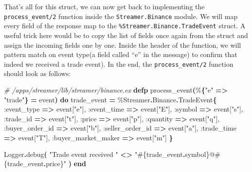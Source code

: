 \documentclass[
  oneside]{book}
\newenvironment{Shaded}{\begin{snugshade}}{\end{snugshade}}
\newcommand{\CommentTok}[1]{\textcolor[rgb]{0.56,0.35,0.01}{\textit{#1}}}
\newcommand{\ConstantTok}[1]{\textcolor[rgb]{0.56,0.35,0.01}{#1}}
\newcommand{\FunctionTok}[1]{\textcolor[rgb]{0.13,0.29,0.53}{\textbf{#1}}}
\newcommand{\KeywordTok}[1]{\textcolor[rgb]{0.13,0.29,0.53}{\textbf{#1}}}
\newcommand{\NormalTok}[1]{#1}
\newcommand{\OperatorTok}[1]{\textcolor[rgb]{0.81,0.36,0.00}{\textbf{#1}}}
\newcommand{\OtherTok}[1]{\textcolor[rgb]{0.56,0.35,0.01}{#1}}
\newcommand{\StringTok}[1]{\textcolor[rgb]{0.31,0.60,0.02}{#1}}
\newcommand{\VariableTok}[1]{\textcolor[rgb]{0.00,0.00,0.00}{#1}}
\begin{document}
That's all for this struct, we can now get back to implementing the \texttt{process\_event/2} function inside the \texttt{Streamer.Binance} module. We will map every field of the response map to the \texttt{\%Streamer.Binance.TradeEvent} struct. A useful trick here would be to copy the list of fields once again from the struct and assign the incoming fields one by one.
Inside the header of the function, we will pattern match on event type(a field called ``e'' in the message) to confirm that indeed we received a trade event). In the end, the \texttt{process\_event/2} function should look as follows:

\begin{Shaded}
\begin{Highlighting}[]
  \CommentTok{\# /apps/streamer/lib/streamer/binance.ex}
  \KeywordTok{defp}\NormalTok{ process\_event}\FunctionTok{(}\NormalTok{\%}\FunctionTok{\{}\StringTok{"e"} \OperatorTok{=\textgreater{}} \StringTok{"trade"}\FunctionTok{\}} \OperatorTok{=}\NormalTok{ event}\FunctionTok{)} \KeywordTok{do}
\NormalTok{    trade\_event }\OperatorTok{=}\NormalTok{ \%}\ConstantTok{Streamer}\OperatorTok{.}\ConstantTok{Binance}\OperatorTok{.}\ConstantTok{TradeEvent}\FunctionTok{\{}
      \VariableTok{:event\_type} \OperatorTok{=\textgreater{}}\NormalTok{ event}\OtherTok{[}\StringTok{"e"}\OtherTok{]}\NormalTok{,}
      \VariableTok{:event\_time} \OperatorTok{=\textgreater{}}\NormalTok{ event}\OtherTok{[}\StringTok{"E"}\OtherTok{]}\NormalTok{,}
      \VariableTok{:symbol} \OperatorTok{=\textgreater{}}\NormalTok{ event}\OtherTok{[}\StringTok{"s"}\OtherTok{]}\NormalTok{,}
      \VariableTok{:trade\_id} \OperatorTok{=\textgreater{}}\NormalTok{ event}\OtherTok{[}\StringTok{"t"}\OtherTok{]}\NormalTok{,}
      \VariableTok{:price} \OperatorTok{=\textgreater{}}\NormalTok{ event}\OtherTok{[}\StringTok{"p"}\OtherTok{]}\NormalTok{,}
      \VariableTok{:quantity} \OperatorTok{=\textgreater{}}\NormalTok{ event}\OtherTok{[}\StringTok{"q"}\OtherTok{]}\NormalTok{,}
      \VariableTok{:buyer\_order\_id} \OperatorTok{=\textgreater{}}\NormalTok{ event}\OtherTok{[}\StringTok{"b"}\OtherTok{]}\NormalTok{,}
      \VariableTok{:seller\_order\_id} \OperatorTok{=\textgreater{}}\NormalTok{ event}\OtherTok{[}\StringTok{"a"}\OtherTok{]}\NormalTok{,}
      \VariableTok{:trade\_time} \OperatorTok{=\textgreater{}}\NormalTok{ event}\OtherTok{[}\StringTok{"T"}\OtherTok{]}\NormalTok{,}
      \VariableTok{:buyer\_market\_maker} \OperatorTok{=\textgreater{}}\NormalTok{ event}\OtherTok{[}\StringTok{"m"}\OtherTok{]}
    \FunctionTok{\}}

    \ConstantTok{Logger}\OperatorTok{.}\NormalTok{debug}\FunctionTok{(}
      \StringTok{"Trade event received "} \OperatorTok{\textless{}\textgreater{}}
        \StringTok{"}\OtherTok{\#\{}\NormalTok{trade\_event}\OperatorTok{.}\NormalTok{symbol}\OtherTok{\}}\StringTok{@}\OtherTok{\#\{}\NormalTok{trade\_event}\OperatorTok{.}\NormalTok{price}\OtherTok{\}}\StringTok{"}
    \FunctionTok{)}
  \KeywordTok{end}
\end{Highlighting}
\end{Shaded}
\end{document}
